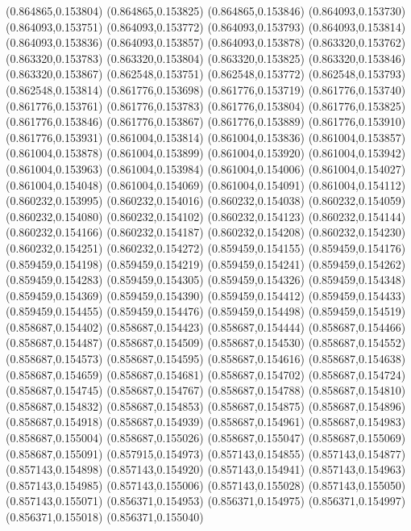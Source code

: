 (0.864865,0.153804)
(0.864865,0.153825)
(0.864865,0.153846)
(0.864093,0.153730)
(0.864093,0.153751)
(0.864093,0.153772)
(0.864093,0.153793)
(0.864093,0.153814)
(0.864093,0.153836)
(0.864093,0.153857)
(0.864093,0.153878)
(0.863320,0.153762)
(0.863320,0.153783)
(0.863320,0.153804)
(0.863320,0.153825)
(0.863320,0.153846)
(0.863320,0.153867)
(0.862548,0.153751)
(0.862548,0.153772)
(0.862548,0.153793)
(0.862548,0.153814)
(0.861776,0.153698)
(0.861776,0.153719)
(0.861776,0.153740)
(0.861776,0.153761)
(0.861776,0.153783)
(0.861776,0.153804)
(0.861776,0.153825)
(0.861776,0.153846)
(0.861776,0.153867)
(0.861776,0.153889)
(0.861776,0.153910)
(0.861776,0.153931)
(0.861004,0.153814)
(0.861004,0.153836)
(0.861004,0.153857)
(0.861004,0.153878)
(0.861004,0.153899)
(0.861004,0.153920)
(0.861004,0.153942)
(0.861004,0.153963)
(0.861004,0.153984)
(0.861004,0.154006)
(0.861004,0.154027)
(0.861004,0.154048)
(0.861004,0.154069)
(0.861004,0.154091)
(0.861004,0.154112)
(0.860232,0.153995)
(0.860232,0.154016)
(0.860232,0.154038)
(0.860232,0.154059)
(0.860232,0.154080)
(0.860232,0.154102)
(0.860232,0.154123)
(0.860232,0.154144)
(0.860232,0.154166)
(0.860232,0.154187)
(0.860232,0.154208)
(0.860232,0.154230)
(0.860232,0.154251)
(0.860232,0.154272)
(0.859459,0.154155)
(0.859459,0.154176)
(0.859459,0.154198)
(0.859459,0.154219)
(0.859459,0.154241)
(0.859459,0.154262)
(0.859459,0.154283)
(0.859459,0.154305)
(0.859459,0.154326)
(0.859459,0.154348)
(0.859459,0.154369)
(0.859459,0.154390)
(0.859459,0.154412)
(0.859459,0.154433)
(0.859459,0.154455)
(0.859459,0.154476)
(0.859459,0.154498)
(0.859459,0.154519)
(0.858687,0.154402)
(0.858687,0.154423)
(0.858687,0.154444)
(0.858687,0.154466)
(0.858687,0.154487)
(0.858687,0.154509)
(0.858687,0.154530)
(0.858687,0.154552)
(0.858687,0.154573)
(0.858687,0.154595)
(0.858687,0.154616)
(0.858687,0.154638)
(0.858687,0.154659)
(0.858687,0.154681)
(0.858687,0.154702)
(0.858687,0.154724)
(0.858687,0.154745)
(0.858687,0.154767)
(0.858687,0.154788)
(0.858687,0.154810)
(0.858687,0.154832)
(0.858687,0.154853)
(0.858687,0.154875)
(0.858687,0.154896)
(0.858687,0.154918)
(0.858687,0.154939)
(0.858687,0.154961)
(0.858687,0.154983)
(0.858687,0.155004)
(0.858687,0.155026)
(0.858687,0.155047)
(0.858687,0.155069)
(0.858687,0.155091)
(0.857915,0.154973)
(0.857143,0.154855)
(0.857143,0.154877)
(0.857143,0.154898)
(0.857143,0.154920)
(0.857143,0.154941)
(0.857143,0.154963)
(0.857143,0.154985)
(0.857143,0.155006)
(0.857143,0.155028)
(0.857143,0.155050)
(0.857143,0.155071)
(0.856371,0.154953)
(0.856371,0.154975)
(0.856371,0.154997)
(0.856371,0.155018)
(0.856371,0.155040)
